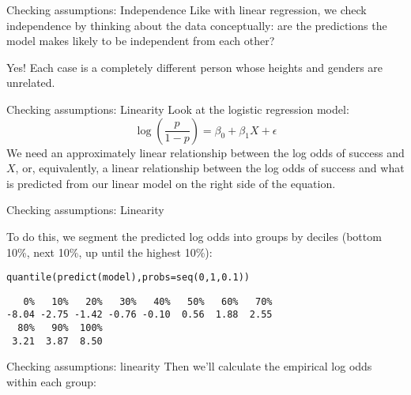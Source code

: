 \documentclass{beamer}\usepackage[]{graphicx}\usepackage[]{color}
\makeatletter
\newcommand{\hlnum}[1]{\textcolor[rgb]{0.824,0.412,0.118}{#1}}%
\newcommand{\hlstd}[1]{\textcolor[rgb]{1,0.894,0.769}{#1}}%
\newcommand{\hlkwc}[1]{\textcolor[rgb]{0.78,0.941,0.545}{#1}}%
\newcommand{\hlkwd}[1]{\textcolor[rgb]{1,0.78,0.769}{#1}}%
\newenvironment{kframe}{%
 \def\at@end@of@kframe{}%
 \ifinner\ifhmode%
  \def\at@end@of@kframe{\end{minipage}}%
  \begin{minipage}{\columnwidth}%
 \fi\fi%
 \def\FrameCommand##1{\hskip\@totalleftmargin \hskip-\fboxsep
 \colorbox{shadecolor}{##1}\hskip-\fboxsep
     \hskip-\linewidth \hskip-\@totalleftmargin \hskip\columnwidth}%
 \MakeFramed {\advance\hsize-\width
   \@totalleftmargin\z@ \linewidth\hsize
   \@setminipage}}%
 {\par\unskip\endMakeFramed%
 \at@end@of@kframe}
\newenvironment{knitrout}{}{} %
\makeatother
\begin{document}
\begin{darkframes}
    \begin{frame}{Checking assumptions: Independence}
      Like with linear regression, we check independence by thinking about the data conceptually: are the predictions the model makes likely to be independent from each other?
      \bigskip\pause

      \greencheckmark \alert{Yes!} Each case is a completely different person whose heights and genders are unrelated.
    \end{frame}

    \begin{frame}{Checking assumptions: Linearity}
      Look at the logistic regression model:
      \[
        \log\left(\frac{p}{1-p}\right) = \beta_0 + \beta_1 X + \epsilon
      \]
      We need an approximately linear relationship between the \alert{log odds of success} and $X$, or, equivalently, a linear relationship between the log odds of success and what is predicted from our linear model on the right side of the equation.
    \end{frame}

    \begin{frame}[fragile]{Checking assumptions: Linearity}
      

      To do this, we segment the predicted log odds into groups by deciles (bottom 10\%, next 10\%, up until the highest 10\%):

\begin{knitrout}
\begin{kframe}
\begin{alltt}
\hlkwd{quantile}\hlstd{(}\hlkwd{predict}\hlstd{(model),} \hlkwc{probs}\hlstd{=}\hlkwd{seq}\hlstd{(}\hlnum{0}\hlstd{,} \hlnum{1}\hlstd{,} \hlnum{0.1}\hlstd{))}
\end{alltt}
\begin{verbatim}
   0%   10%   20%   30%   40%   50%   60%   70% 
-8.04 -2.75 -1.42 -0.76 -0.10  0.56  1.88  2.55 
  80%   90%  100% 
 3.21  3.87  8.50 
\end{verbatim}
\end{kframe}
\end{knitrout}
    \end{frame}

    \begin{frame}{Checking assumptions: linearity}
      Then we'll calculate the empirical log odds within each group:


\end{frame}
\end{darkframes}
\end{document}
